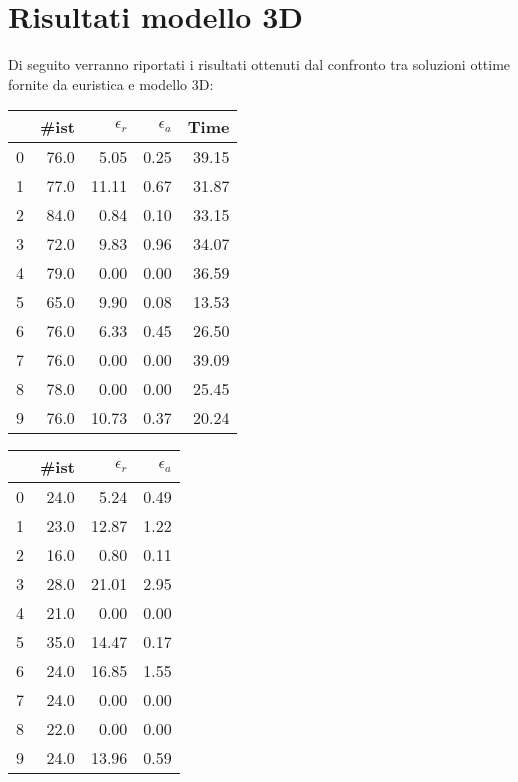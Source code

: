 \section{Risultati modello 3D}
Di seguito verranno riportati i risultati ottenuti dal confronto tra soluzioni ottime fornite da euristica e modello 3D:
\begin{center}
	\begin{table}[H]
		\begin{minipage}{0.4\textwidth}
			\centering
			\begin{tabular}{lrrrr}
				\toprule
				{} & \#ist & $\epsilon_r$ & $\epsilon_a$ & Time  \\
				\midrule
				0  & 76.0  & 5.05         & 0.25         & 39.15 \\
				1  & 77.0  & 11.11        & 0.67         & 31.87 \\
				2  & 84.0  & 0.84         & 0.10         & 33.15 \\
				3  & 72.0  & 9.83         & 0.96         & 34.07 \\
				4  & 79.0  & 0.00         & 0.00         & 36.59 \\
				5  & 65.0  & 9.90         & 0.08         & 13.53 \\
				6  & 76.0  & 6.33         & 0.45         & 26.50 \\
				7  & 76.0  & 0.00         & 0.00         & 39.09 \\
				8  & 78.0  & 0.00         & 0.00         & 25.45 \\
				9  & 76.0  & 10.73        & 0.37         & 20.24 \\
				\bottomrule
			\end{tabular}
		\end{minipage}
		\begin{minipage}{0.5\textwidth}
			\centering
			\begin{tabular}{lrrr}
				\toprule
				{} & \#ist & $\epsilon_r$ & $\epsilon_a$ \\
				\midrule
				0  & 24.0  & 5.24         & 0.49         \\
				1  & 23.0  & 12.87        & 1.22         \\
				2  & 16.0  & 0.80         & 0.11         \\
				3  & 28.0  & 21.01        & 2.95         \\
				4  & 21.0  & 0.00         & 0.00         \\
				5  & 35.0  & 14.47        & 0.17         \\
				6  & 24.0  & 16.85        & 1.55         \\
				7  & 24.0  & 0.00         & 0.00         \\
				8  & 22.0  & 0.00         & 0.00         \\
				9  & 24.0  & 13.96        & 0.59         \\
				\bottomrule
			\end{tabular}
		\end{minipage}
	\end{table}
\end{center}
